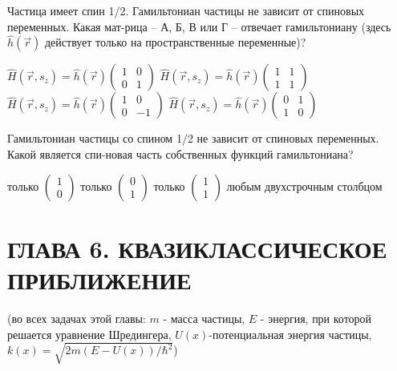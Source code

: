\documentclass[11pt,a4paper]{exam}
\begin{document}
\begin{questions}
\question Частица имеет спин 1/2. Гамильтониан частицы не зависит от спиновых переменных. Какая мат-рица – А, Б, В или Г – отвечает гамильтониану (здесь $\hat h(\vec r)$ действует только на пространственные переменные)?
\begin{choices}
\choice $\hat H(\vec r,{s_z}) = \hat h(\vec r)\left( {\begin{array}{*{20}{c}}
1&0\\
0&1
\end{array}} \right)$         
\choice $\hat H(\vec r,{s_z}) = \hat h(\vec r)\left( {\begin{array}{*{20}{c}}
1&1\\
1&1
\end{array}} \right)$
\choice $\hat H(\vec r,{s_z}) = \hat h(\vec r)\left( {\begin{array}{*{20}{c}}
1&0\\
0&{ - 1}
\end{array}} \right)$         
\choice $\hat H(\vec r,{s_z}) = \hat h(\vec r)\left( {\begin{array}{*{20}{c}}
0&1\\
1&0
\end{array}} \right)$ 
\end{choices}

\question Гамильтониан частицы со спином 1/2 не зависит от спиновых переменных. Какой является спи-новая часть собственных функций гамильтониана?
\begin{choices}
\choice только $\left( {\begin{array}{*{20}{c}}
1\\
0
\end{array}} \right)$   
\choice только $\left( {\begin{array}{*{20}{c}}
0\\
1
\end{array}} \right)$      
\choice только $\left( {\begin{array}{*{20}{c}}
1\\
1
\end{array}} \right)$      
\choice любым двухстрочным столбцом
\end{choices}

\end{questions}

\section{ ГЛАВА 6. КВАЗИКЛАССИЧЕСКОЕ ПРИБЛИЖЕНИЕ }
(во всех задачах этой главы: $m$ - масса частицы, $E$ - энергия, при которой решается уравнение Шредингера, $U(x)$-потенциальная энергия частицы, $k(x) = \sqrt {2m\left( {E - U(x)} \right)/{\hbar ^2}} $)
\end{document}
